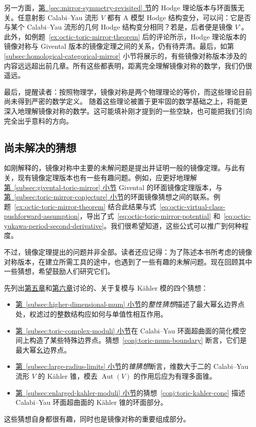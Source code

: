 另一方面，\hyperref[sec:mirror-symmetry-revisited]{第~\ref*{sec:mirror-symmetry-revisited} 节}的 Hodge 理论版本与环面簇无关。任意射影 Calabi--Yau 流形 $V$ 都有 A 模型 Hodge 结构变分，可以问：它是否与某个 Calabi--Yau 流形的几何 Hodge 结构变分相同？若是，后者便是镜像 $V^\circ$。此外，如例题~\ref{ex:octic-toric-mirror-theorem} 后的评论所示，Hodge 理论版本的镜像对称与 Givental 版本的镜像定理之间的关系，仍有待弄清。最后，如第 \hyperref[subsec:homological-categorical-mirror]{\ref*{subsec:homological-categorical-mirror}} 小节将展示的，有些镜像对称版本涉及的内容远远超出前几章。所有这些都表明，距离完全理解镜像对称的数学，我们仍很遥远。

最后，提醒读者：按照物理学，镜像对称是两个物理理论的等价，而这些理论目前尚未得到严密的数学定义。
随着这些理论被置于更牢固的数学基础之上，将能更深入地理解镜像对称的数学。这可能填补刚才提到的一些空缺，也可能把我们引向完全出乎意料的方向。

\subsection{尚未解决的猜想}\label{subsec:open-conjectures}
如刚解释的，镜像对称中主要的未解问题是提出并证明一般的镜像定理。与此有关，现有镜像定理版本也有一些有趣问题。例如，应更好地理解\hyperref[subsec:givental-toric-mirror]{第~\ref*{subsec:givental-toric-mirror} 小节} Givental 的环面镜像定理版本，与\hyperref[subsec:toric-mirror-conjecture]{第~\ref*{subsec:toric-mirror-conjecture} 小节}的环面镜像猜想之间的联系。例题~\ref{ex:octic-toric-mirror-theorem} 结合此结果与式~\eqref{eq:octic-virtual-class-pushforward-assumption}，导出了式~\eqref{eq:octic-toric-mirror-potential} 和~\eqref{eq:octic-yukawa-period-second-derivative}。我们很希望知道，这些公式可以推广到何种程度。

不过，镜像定理提出的问题并非全部。读者还应记得：为了陈述本书所考虑的镜像对称版本，在建立所需工具的途中，也遇到了一些有趣的未解问题。现在回顾其中一些猜想，希望鼓励人们研究它们。

先列出\hyperref[chap:hodge-yukawa]{第五章}和\hyperref[chap:moduli]{第六章}讨论的、关于复模与 Kähler 模的四个猜想：
\begin{itemize}
\item \hyperref[subsec:higher-dimensional-mum]{第~\ref*{subsec:higher-dimensional-mum} 小节}的\emph{整性猜想}描述了最大幂幺边界点处，权滤过的整数结构应如何与单值性相互作用。
\item \hyperref[subsec:toric-complex-moduli]{第~\ref*{subsec:toric-complex-moduli} 小节}在 Calabi--Yau 环面超曲面的简化模空间上构造了某些特殊边界点。猜想~\ref{conj:toric-mum-boundary} 断言，它们是最大幂幺边界点。
\item \hyperref[subsec:large-radius-limits]{第~\ref*{subsec:large-radius-limits} 小节}的\emph{锥猜想}断言，维数大于二的 Calabi--Yau 流形 $V$ 的 Kähler 锥，模去 $\operatorname{Aut}(V)$ 的作用后应为有理多面锥。
\item \hyperref[subsec:enlarged-kahler-moduli]{第~\ref*{subsec:enlarged-kahler-moduli} 小节}的猜想~\ref{conj:toric-kahler-cone} 描述 Calabi--Yau 环面超曲面的 Kähler 锥的环面部分。
\end{itemize}
这些猜想自身都很有趣，同时也是镜像对称的重要组成部分。

